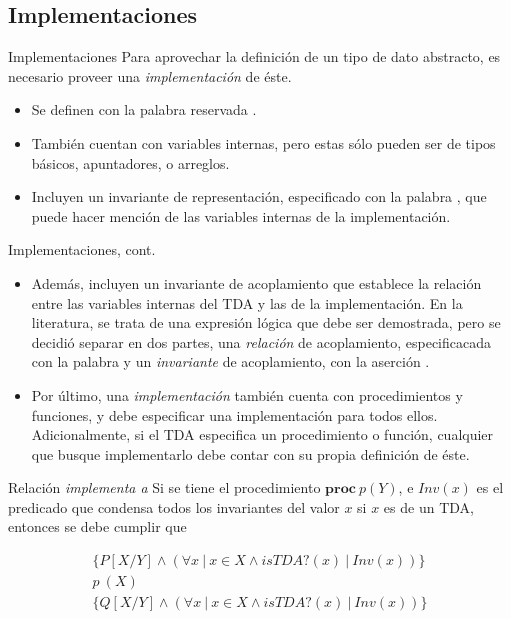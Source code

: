 \subsection*{Implementaciones}
\begin{frame}{Implementaciones}
Para aprovechar la definición de un tipo de dato abstracto, es necesario proveer una \textit{implementación} de éste.
\begin{itemize}
  \item Se definen con la palabra reservada .
  \item También cuentan con variables internas, pero estas sólo pueden ser de tipos básicos, apuntadores, o arreglos.
  \item Incluyen un invariante de representación, especificado con la palabra , que puede hacer mención de las variables internas de la implementación.
\end{itemize}
\end{frame}

\begin{frame}{Implementaciones, cont.}
\begin{itemize}
    \item Además, incluyen un invariante de acoplamiento que establece la relación entre las variables internas del TDA y las de la implementación. En la literatura, se trata de una expresión lógica que debe ser demostrada, pero se decidió separar en dos partes, una \textit{relación} de acoplamiento, especificacada con la palabra  y un \textit{invariante} de acoplamiento, con la aserción .
  \item Por último, una \textit{implementación} también cuenta con procedimientos y funciones, y debe especificar una implementación para todos ellos. Adicionalmente, si el TDA especifica un procedimiento o función, cualquier  que busque implementarlo debe contar con su propia definición de éste.
\end{itemize}
\end{frame}

\begin{frame}{Relación \textit{implementa a}}
Si se tiene el procedimiento $\textbf{proc}\ p (Y)$, e $Inv(x)$ es el predicado que condensa todos los
invariantes del valor $x$ si $x$ es de un TDA, entonces se debe cumplir que

\begin{equation*} \label{eqn:tdatriple}
\begin{gathered}
  \{ P[X/Y] \land (\forall x\ |\ x \in X \land isTDA?(x)\ |\ Inv(x) )\}\\
  p\ (X)\\
  \{ Q[X/Y] \land (\forall x\ |\ x \in X \land isTDA?(x)\ |\ Inv(x) )\}
\end{gathered}
\end{equation*}
\end{frame}

